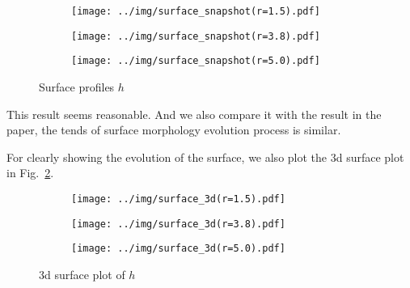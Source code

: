 \documentclass[runningheads]{llncs}
\begin{document}
\begin{figure}[!htbp]
    \centering
    \begin{subfigure}{.4\textwidth}
        \centering
        \texttt{[image: ../img/surface\_snapshot(r=1.5).pdf]}  
    \end{subfigure}
    \begin{subfigure}{.4\textwidth}
        \centering
        \texttt{[image: ../img/surface\_snapshot(r=3.8).pdf]}  
    \end{subfigure}
    \begin{subfigure}{.4\textwidth}
        \centering
        \texttt{[image: ../img/surface\_snapshot(r=5.0).pdf]}  
    \end{subfigure}
    \caption{Surface profiles $h$}
    \label{fig:1}
\end{figure}
This result seems reasonable. 
And we also compare it with the result in the paper\cite{dong2023corrosion}, the tends of surface morphology evolution process is similar.

For clearly showing the evolution of the surface, we also plot the 3d surface plot in Fig.~\ref{fig:2}.

\begin{figure}[!htbp]
    \centering
    \begin{subfigure}{.4\textwidth}
        \centering
        \texttt{[image: ../img/surface\_3d(r=1.5).pdf]}  
    \end{subfigure}
    \begin{subfigure}{.4\textwidth}
        \centering
        \texttt{[image: ../img/surface\_3d(r=3.8).pdf]}  
    \end{subfigure}
    \begin{subfigure}{.4\textwidth}
        \centering
        \texttt{[image: ../img/surface\_3d(r=5.0).pdf]}  
    \end{subfigure}
    \caption{3d surface plot of $h$}
    \label{fig:2}
\end{figure}

\end{document}
